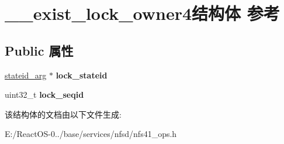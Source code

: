 \hypertarget{struct____exist__lock__owner4}{}\section{\+\_\+\+\_\+exist\+\_\+lock\+\_\+owner4结构体 参考}
\label{struct____exist__lock__owner4}
\subsection*{Public 属性}
\begin{DoxyCompactItemize}
\item 
\mbox{\label{struct____exist__lock__owner4_a6dff9996ffde2ce8e0bec4e47cfbcc8b}} 
\hyperlink{struct____stateid__arg}{stateid\+\_\+arg} $\ast$ {\bfseries lock\+\_\+stateid}
\item 
\mbox{\label{struct____exist__lock__owner4_af6f5800e11837d2078a4c46d61b24d9a}} 
uint32\+\_\+t {\bfseries lock\+\_\+seqid}
\end{DoxyCompactItemize}


该结构体的文档由以下文件生成\+:\begin{DoxyCompactItemize}
\item 
E\+:/\+React\+O\+S-\/0../base/services/nfsd/nfs41\+\_\+ops.\+h\end{DoxyCompactItemize}
